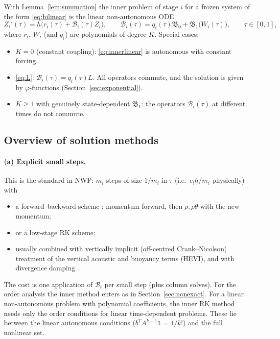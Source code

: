 \documentclass[11pt,a4paper]{article}
\theoremstyle{definition}
\theoremstyle{remark}
\begin{document}
With Lemma~\ref{lem:summation} the inner problem of stage $i$ for a
frozen system of the form \eqref{eq:bilinear} is the linear
non-autonomous ODE
\begin{equation}\label{eq:innerlinear}
 Z_i'(\tau)=h\Big(r_i(\tau)+\mathcal B_i(\tau)Z_i\Big),\qquad
 \mathcal B_i(\tau)=q_i(\tau)\mathfrak B_0+\mathfrak B_1\big(W_i(\tau)\big),
 \qquad\tau\in[0,1],
\end{equation}
where $r_i$, $W_i$ (and $q_i$) are polynomials of degree $K$. Special
cases:
\begin{itemize}
\item $K=0$ (constant coupling): \eqref{eq:innerlinear} is autonomous
  with constant forcing.
\item \eqref{eq:L}: $\mathcal B_i(\tau)=q_i(\tau)L$. All operators
  commute, and the solution is given by $\varphi$-functions
  (Section~\ref{sec:exponential}).
\item $K\ge1$ with genuinely state-dependent $\mathfrak B_1$: the operators
  $\mathcal B_i(\tau)$ at different times do not commute.
\end{itemize}

\subsection{Overview of solution methods}

\paragraph{(a) Explicit small steps.} This is the standard in NWP:
$m_i$ steps of size $1/m_i$ in $\tau$ (i.e.\ $c_ih/m_i$ physically) with
\begin{itemize}
\item a forward--backward scheme \cite{Mesinger1977}: momentum forward,
  then $\rho,\rho\theta$ with the new momentum;
\item or a low-stage RK scheme;
\item usually combined with vertically implicit (off-centred
  Crank--Nicolson) treatment of the vertical acoustic and buoyancy terms
  (HEVI), and with divergence damping \cite{KlempSkamarockDudhia2007,Baldauf2010}.
\end{itemize}
The cost is one application of $\mathcal B_i$ per small step (plus
column solves). For the order analysis the inner method enters as in
Section~\ref{sec:nonexact}. For a linear non-autonomous problem with
polynomial coefficients, the inner RK method needs only the order
conditions for linear time-dependent problems. These lie between the
linear autonomous conditions ($b^TA^{k-1}\mathbb 1=1/k!$) and the full
nonlinear set.
\end{document}
